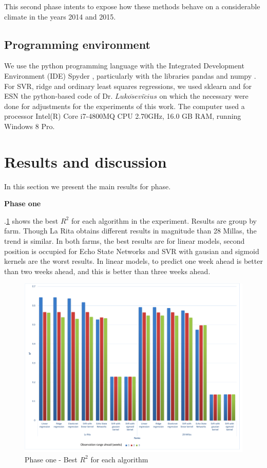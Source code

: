 \documentclass[review,authoryear,english]{elsarticle}
\begin{document}
This second phase intents to expose how these methods behave on a considerable climate in the years 2014 and 2015.

\subsection{Programming environment}

We use the python programming language with the Integrated Development Environment (IDE) Spyder \citep{Continuum2015}, particularly with the libraries pandas \citep{mckinneypandas2010} and numpy \citep{vanderWalt2011}. For SVR, ridge and ordinary least squares regressions, we used sklearn \citep{scikitlearn2011} and for ESN the python-based code of Dr. $Luko\breve{s} evi \breve{c} ius$ \citep{Lukose2012} on which the necessary were done for adjustments for the experiments of this work. The computer used a processor Intel(R) Core i7-4800MQ CPU 2.70GHz, 16.0 GB RAM, running Windows 8 Pro.

\section{Results and discussion}

In this section we present the main results for phase.

{\bf Phase one } 

\figurename $.$\ref{figura4} shows the best $R^2$ for each algorithm in the experiment. Results are group by farm. Though La Rita obtains different results in magnitude than 28 Millas, the trend is similar. In both farms, the best results are for linear models, second position is occupied for Echo State Networks and  SVR with gausian and sigmoid kernels are the worst results. In linear models, to predict one week ahead is better than two weeks ahead, and this is better than three weeks ahead. 

\begin{figure}[H] 
 \centering
 \includegraphics[scale=.5]{Phase_one_Best_R2_for_each_algortihm}
 \caption{Phase one - Best $R^2$ for each algorithm} 
 \label{figura4} 
\end{figure}
\end{document}

